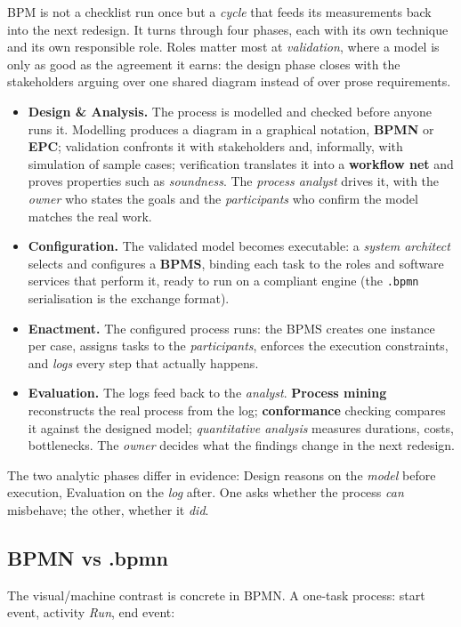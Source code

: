 BPM is not a checklist run once but a \emph{cycle} that feeds its measurements back into the next redesign. It turns through four phases, each with its own technique and its own responsible role. Roles matter most at \emph{validation}, where a model is only as good as the agreement it earns: the design phase closes with the stakeholders arguing over one shared diagram instead of over prose requirements.
\begin{itemize}
  \item \textbf{Design \& Analysis.} The process is modelled and checked before anyone runs it. Modelling produces a diagram in a graphical notation, \textbf{BPMN} or \textbf{EPC}; validation confronts it with stakeholders and, informally, with simulation of sample cases; verification translates it into a \textbf{workflow net} and proves properties such as \emph{soundness}. The \emph{process analyst} drives it, with the \emph{owner} who states the goals and the \emph{participants} who confirm the model matches the real work.
  \item \textbf{Configuration.} The validated model becomes executable: a \emph{system architect} selects and configures a \textbf{BPMS}, binding each task to the roles and software services that perform it, ready to run on a compliant engine (the \texttt{.bpmn} serialisation is the exchange format).
  \item \textbf{Enactment.} The configured process runs: the BPMS creates one instance per case, assigns tasks to the \emph{participants}, enforces the execution constraints, and \emph{logs} every step that actually happens.
  \item \textbf{Evaluation.} The logs feed back to the \emph{analyst}. \textbf{Process mining} reconstructs the real process from the log; \textbf{conformance} checking compares it against the designed model; \emph{quantitative analysis} measures durations, costs, bottlenecks. The \emph{owner} decides what the findings change in the next redesign.
\end{itemize}
The two analytic phases differ in evidence: Design reasons on the \emph{model} before execution, Evaluation on the \emph{log} after. One asks whether the process \emph{can} misbehave; the other, whether it \emph{did}.

\subsection{BPMN vs .bpmn}

The visual/machine contrast is concrete in BPMN. A one-task process: start event, activity \emph{Run}, end event:

